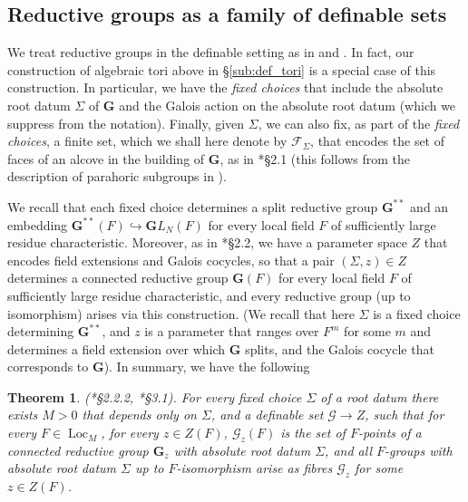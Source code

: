 \documentclass{amsart}
\newcommand{\cF}{\mathcal{F}}
\newcommand{\loc}{\operatorname{Loc}}
\newcommand{\bG}{\mathbf{G}}
\newcommand{\cG}{\mathcal{G}}
\theoremstyle{plain}
\newtheorem{theorem}[thm]{Theorem}
\theoremstyle{definition}
\begin{document}
\subsection{Reductive groups as a family of definable sets}
We treat reductive groups in the definable setting as in \cite{hales:transfert} and \cite{CGH-2}.
In fact, our construction of algebraic tori above in \S \ref{sub:def_tori} is a special case of this construction. 
In particular, we have the \emph{fixed choices} that include the absolute root datum $\Sigma$ of $\bG$ %
and  the Galois action on the absolute root datum  (which we suppress from the notation). Finally, given $\Sigma$, we can also fix, as part of the \emph{fixed choices},  a finite set, which we shall here denote by 
$\cF_\Sigma$, that encodes the set of faces of an alcove in the building of $\bG$, as in \cite{hales:transfert}*{\S 2.1} (this follows from the description of parahoric subgroups in  \cite{gross:parahorics}).  

We recall that each  fixed choice determines  a split reductive group $\bG^{\ast\ast}$ and an embedding 
$\bG^{\ast\ast}(F)\hookrightarrow {\mathbf GL}_N(F)$ for every local field $F$ of sufficiently large residue characteristic.  
Moreover, as in \cite{hales:transfert}*{\S 2.2}, we  have a parameter space $Z$ that encodes field extensions and Galois cocycles, so that a pair 
$(\Sigma, z)\in Z$ determines a connected reductive group $\bG(F)$ for every local field $F$ of sufficiently large residue characteristic, and every reductive group (up to isomorphism)  arises via this construction. 
(We recall that here $\Sigma$ is a fixed choice determining $\bG^{\ast\ast}$, and $z$ is a parameter that ranges over $F^m$ for some $m$ and determines a field extension over which $\bG$ splits, and the Galois cocycle that corresponds to $\bG$). 
In summary, we have the following 
\begin{theorem}\label{thm:def_groups}(\cite{hales:transfert}*{\S 2.2.2}, \cite{CGH-2}*{\S 3.1}). 
 For every fixed choice $\Sigma$ of a root datum there exists $M>0$ that depends only on 
$\Sigma$, and a  definable set $\cG \to Z$, such that 
for every $F\in \loc_M$, for every $z\in Z(F)$, ${\cG_z}(F)$ is the set of $F$-points of a connected reductive group $\bG_z$ with absolute root datum $\Sigma$, and all $F$-groups with absolute root datum 
$\Sigma$ up to $F$-isomorphism arise as fibres $\cG_z$ for some $z\in Z(F)$.  
\end{theorem}
\end{document}
